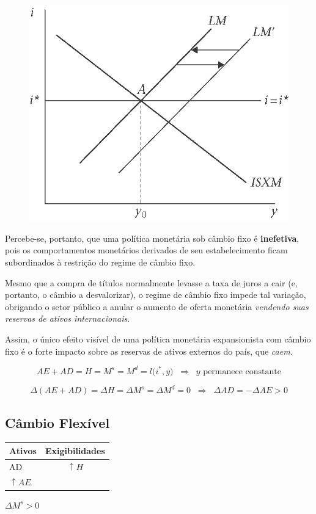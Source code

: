 \documentclass[a4paper,12pt]{article}[abntex2]
\begin{document}
\begin{figure}[H]
    \centering
    \includegraphics[width=0.7\linewidth]{Imagens/a23i1.png}
\end{figure}


Percebe-se, portanto, que uma política monetária sob câmbio fixo é \textbf{inefetiva}, pois os comportamentos
monetários derivados de seu estabelecimento ficam subordinados à restrição
do regime de câmbio fixo.  

Mesmo que a compra de títulos normalmente levasse a taxa de juros a cair (e,
portanto, o câmbio a desvalorizar), o regime de câmbio fixo impede tal variação, obrigando o setor público a anular o aumento de oferta monetária \emph{vendendo suas reservas de ativos internacionais}.  

Assim, o único efeito visível de uma política monetária expansionista com
câmbio fixo é o forte impacto sobre as reservas de ativos externos do país,
que \emph{caem}.

\[
AE+AD = H = M^{s}=M^{d}=l\!\bigl(i^{\ast},y\bigr)
\;\;\Longrightarrow\;\; y \text{ permanece constante}
\]

\[
\Delta(AE+AD)=\Delta H=\Delta M^{s}=\Delta M^{d}=0
\;\;\Longrightarrow\;\;
\boxed{\Delta AD=-\Delta AE>0}
\]

\subsection{\textbf{Câmbio Flexível}}



\begin{center}
\begin{tabular}{|l|c|}
\hline
\textbf{Ativos} & \textbf{Exigibilidades} \\ \hline
AD & $\uparrow H$ \\ \hline
$\uparrow AE$ &  \\ \hline
\end{tabular}
\qquad\qquad
$\Delta M^{s}>0$
\end{center}
\end{document}
